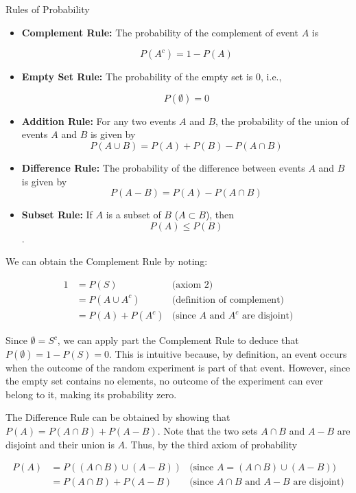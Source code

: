 \begin{theorem}{Rules of Probability}
    \begin{itemize}
        \item \textbf{Complement Rule:} The probability of the complement of event $A$ is
    
        \[
        P(A^c) = 1 - P(A)
        \]

        \item \textbf{Empty Set Rule:} The probability of the empty set is 0, i.e.,
        
        \[P(\emptyset) = 0\]
        
        \item \textbf{Addition Rule:} For any two events $A$ and $B$, the probability of the union of events $A$ and $B$ is given by
        \[
        P(A \cup B) = P(A) + P(B) - P(A \cap B)
        \]

        \item \textbf{Difference Rule:} The probability of the difference between events $A$ and $B$ is given by
        \[
        P(A-B)=P(A)-P(A \cap B)
        \]
        \item \textbf{Subset Rule:} If $A$ is a subset of $B$ ($A \subset B$), then
        \[P(A) \leq P(B)\].
    \end{itemize}
\end{theorem}

We can obtain the Complement Rule by noting:

\begin{align*}
    1 &= P(S) & \text{(axiom 2)} \\
      &= P(A \cup A^c) & \text{(definition of complement)} \\
      &= P(A) + P(A^c) & \text{(since } A \text{ and } A^c \text{ are disjoint)}
\end{align*}

Since $\emptyset=S^c$, we can apply part the Complement Rule to deduce that $P(\emptyset)=1-P(S)=0$. This is intuitive because, by definition, an event occurs when the outcome of the random experiment is part of that event. However, since the empty set contains no elements, no outcome of the experiment can ever belong to it, making its probability zero.

The Difference Rule can be obtained by showing that $P(A)=P(A \cap B)+P(A-B)$. Note that the two sets $A \cap B$ and $A-B$ are disjoint and their union is $A$. Thus, by the third axiom of probability

\begin{align*}
    P(A) &= P\left((A \cap B) \cup (A - B)\right) & \text{(since } A = (A \cap B) \cup (A - B)) \\
         &= P(A \cap B) + P(A - B) & \text{(since } A \cap B \text{ and } A - B \text{ are disjoint)}
    \end{align*}
    

